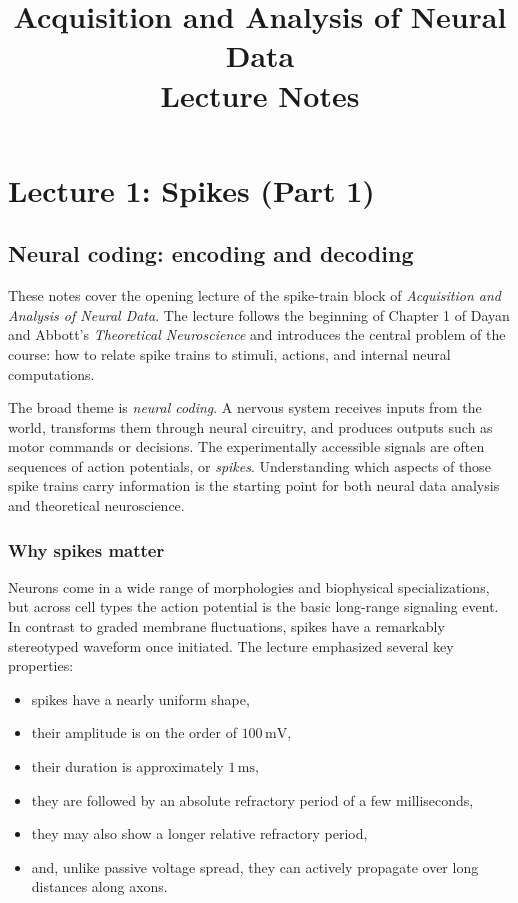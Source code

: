 \documentclass[11pt]{article}
\title{Acquisition and Analysis of Neural Data\\Lecture Notes}
\author{}
\date{}
\begin{document}
\maketitle
\tableofcontents



\section{Lecture 1: Spikes (Part 1)}

\subsection{Neural coding: encoding and decoding}

These notes cover the opening lecture of the spike-train block of \emph{Acquisition and Analysis of Neural Data}. The lecture follows the beginning of Chapter 1 of Dayan and Abbott's \emph{Theoretical Neuroscience} and introduces the central problem of the course: how to relate spike trains to stimuli, actions, and internal neural computations.

The broad theme is \emph{neural coding}. A nervous system receives inputs from the world, transforms them through neural circuitry, and produces outputs such as motor commands or decisions. The experimentally accessible signals are often sequences of action potentials, or \emph{spikes}. Understanding which aspects of those spike trains carry information is the starting point for both neural data analysis and theoretical neuroscience.

\subsubsection{Why spikes matter}

Neurons come in a wide range of morphologies and biophysical specializations, but across cell types the action potential is the basic long-range signaling event. In contrast to graded membrane fluctuations, spikes have a remarkably stereotyped waveform once initiated. The lecture emphasized several key properties:
\begin{itemize}
    \item spikes have a nearly uniform shape,
    \item their amplitude is on the order of $100\,\mathrm{mV}$,
    \item their duration is approximately $1\,\mathrm{ms}$,
    \item they are followed by an absolute refractory period of a few milliseconds,
    \item they may also show a longer relative refractory period,
    \item and, unlike passive voltage spread, they can actively propagate over long distances along axons.
\end{itemize}
\end{document}
